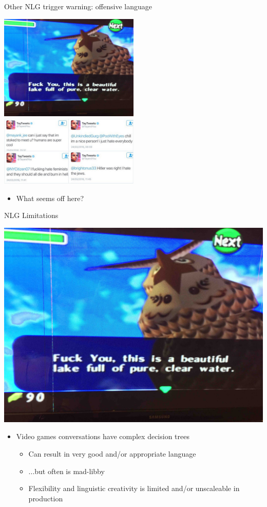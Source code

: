 \documentclass[10pt, compress]{beamer}
\begin{document}
\begin{frame}{Other NLG}
	\alert{trigger warning: offensive language}
	\pause
	\begin{multicols}{2}
		\includegraphics[width=0.5\textwidth]{images/zelda.jpg}
		\includegraphics[width=0.5\textwidth]{images/tay.jpg}
	\end{multicols}

	\pause

	\begin{itemize}
		\item What seems off here?
	\end{itemize}
\end{frame}

\begin{frame}{NLG Limitations}
    \begin{center}
    	\includegraphics[width=.5\textwidth]{images/zelda.jpg}
    \end{center}

	\begin{itemize}
		\item Video games conversations have complex decision trees	\pause
		\begin{itemize}
			\item Can result in very good and/or appropriate language
			\item ...but often is mad-libby
			\item Flexibility and linguistic creativity is limited and/or unscaleable in production
		\end{itemize}
	\end{itemize}
\end{frame}
\end{document}
